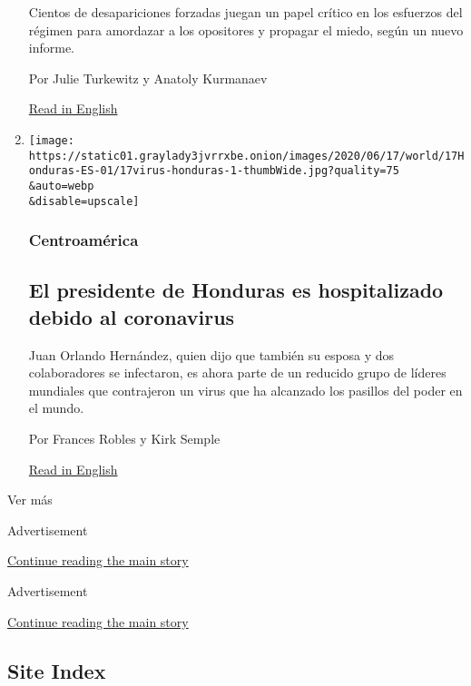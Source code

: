 \begin{enumerate}
  Cientos de desapariciones forzadas juegan un papel crítico en los
  esfuerzos del régimen para amordazar a los opositores y propagar el
  miedo, según un nuevo informe.

  Por Julie Turkewitz y Anatoly Kurmanaev

  \href{https://www.nytimes3xbfgragh.onion/2020/06/19/world/americas/venezuela-forced-disappearances-Maduro.html}{Read
  in English}
\item
  \href{/es/2020/06/17/espanol/america-latina/presidente-honduras-coronavirus.html}{}

  \texttt{[image: https://static01.graylady3jvrrxbe.onion/images/2020/06/17/world/17Honduras-ES-01/17virus-honduras-1-thumbWide.jpg?quality=75\\\&auto=webp\\\&disable=upscale]}

  \hypertarget{centroamuxe9rica}{%
  \subsubsection{Centroamérica}\label{centroamuxe9rica}}

  \hypertarget{el-presidente-de-honduras-es-hospitalizado-debido-al-coronavirus}{%
  \subsection{El presidente de Honduras es hospitalizado debido al
  coronavirus}\label{el-presidente-de-honduras-es-hospitalizado-debido-al-coronavirus}}

  Juan Orlando Hernández, quien dijo que también su esposa y dos
  colaboradores se infectaron, es ahora parte de un reducido grupo de
  líderes mundiales que contrajeron un virus que ha alcanzado los
  pasillos del poder en el mundo.

  Por Frances Robles y Kirk Semple

  \href{https://www.nytimes3xbfgragh.onion/2020/06/17/world/americas/honduras-president-coronavirus.html}{Read
  in English}
\end{enumerate}

Ver más

Advertisement

\protect\hyperlink{after-mid2}{Continue reading the main story}

Advertisement

\protect\hyperlink{after-mktg}{Continue reading the main story}

\hypertarget{site-index}{%
\subsection{Site Index}\label{site-index}}

